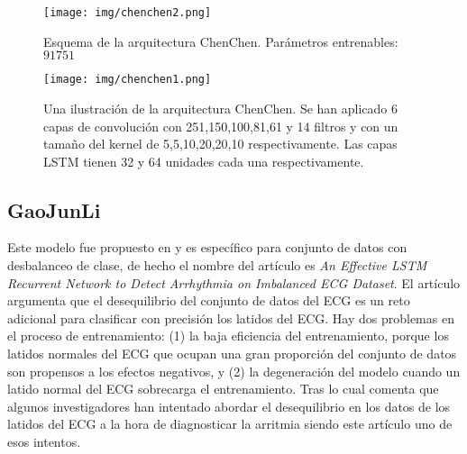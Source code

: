             \begin{figure}[htpb]
                \centering
                \texttt{[image: img/chenchen2.png]}
                \caption{Esquema de la arquitectura ChenChen. Parámetros entrenables: $91751$}
                \label{fig:chenchen2}
            \end{figure}
            
            \begin{figure}[htpb]
                \centering
                \texttt{[image: img/chenchen1.png]}
                \caption{Una ilustración de la arquitectura ChenChen. Se han aplicado 6 capas de convolución con 251,150,100,81,61 y 14 filtros y con un tamaño del kernel de 5,5,10,20,20,10 respectivamente. Las capas LSTM tienen 32 y 64 unidades cada una respectivamente.}
                \label{fig:chenchen1}
            \end{figure}
        
    
    
        
    \subsection{GaoJunLi}
    
    Este modelo fue propuesto en \cite{GaoJunLi} y es específico para conjunto de datos con desbalanceo de clase, de hecho el nombre del artículo es \textit{An Effective LSTM Recurrent Network to Detect Arrhythmia on Imbalanced ECG Dataset}. El artículo argumenta que el desequilibrio del conjunto de datos del ECG es un reto adicional para clasificar con precisión los latidos del ECG. Hay dos problemas en el proceso de entrenamiento: (1) la baja eficiencia del entrenamiento, porque los latidos normales del ECG que ocupan una gran proporción del conjunto de datos son propensos a los efectos negativos, y (2) la degeneración del modelo cuando un latido normal del ECG sobrecarga el entrenamiento. Tras lo cual comenta que algunos investigadores han intentado abordar el desequilibrio en los datos de los latidos del ECG a la hora de diagnosticar la arritmia siendo este artículo uno de esos intentos. \\
    
